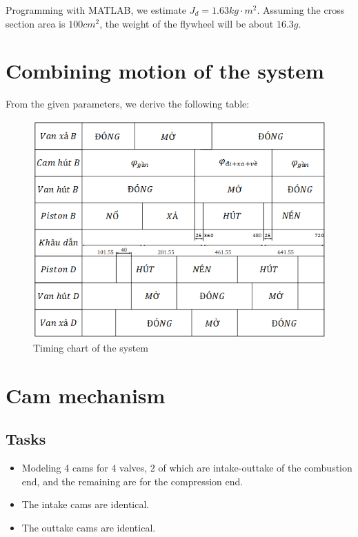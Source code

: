 Programming with MATLAB\textup{\textregistered}, we estimate $ J_d=1.63\unit{kg\cdot m^2} $. Assuming the cross section area is $ 100\unit{cm^2} $, the weight of the flywheel will be about $ 16.3\unit{g} $.
\section{Combining motion of the system}
From the given parameters, we derive the following table:
\begin{figure}[h]
	\centering
	\includegraphics[width=0.6\linewidth]{23}
	\caption{Timing chart of the system}
	\label{fig:23}
\end{figure}
\section{Cam mechanism}
\subsection{Tasks}
\begin{itemize}
	\item Modeling 4 cams for 4 valves, 2 of which are intake-outtake of the combustion end, and the remaining are for the compression end.
	\item The intake cams are identical.
	\item The outtake cams are identical.
\end{itemize}
